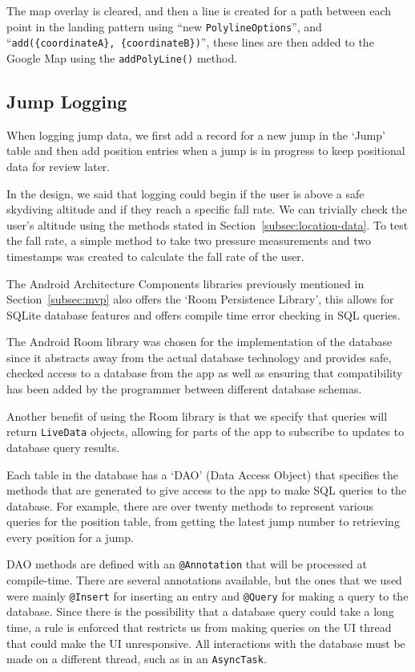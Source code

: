 The map overlay is cleared, and then a line is created for a path between each point in the landing pattern using ``new \texttt{PolylineOptions}'', and ``\verb|add({coordinateA}, {coordinateB})|'', these lines are then added to the Google Map using the \texttt{addPolyLine()} method.

\subsection{Jump Logging}
When logging jump data, we first add a record for a new jump in the `Jump' table and then add position entries when a jump is in progress to keep positional data for review later.

In the design, we said that logging could begin if the user is above a safe skydiving altitude and if they reach a specific fall rate. We can trivially check the user's altitude using the methods stated in Section~\ref{subsec:location-data}. To test the fall rate, a simple method to take two pressure measurements and two timestamps was created to calculate the fall rate of the user.

The Android Architecture Components libraries previously mentioned in Section~\ref{subsec:mvp} also offers the `Room Persistence Library', this allows for SQLite database features and offers compile time error checking in SQL queries.

The Android Room library was chosen for the implementation of the database since it abstracts away from the actual database technology and provides safe, checked access to a database from the app as well as ensuring that compatibility has been added by the programmer between different database schemas.

Another benefit of using the Room library is that we specify that queries will return \texttt{LiveData} objects, allowing for parts of the app to subscribe to updates to database query results.

Each table in the database has a `DAO' (Data Access Object) that specifies the methods that are generated to give access to the app to make SQL queries to the database. For example, there are over twenty methods to represent various queries for the position table, from getting the latest jump number to retrieving every position for a jump.

DAO methods are defined with an \texttt{@Annotation} that will be processed at compile-time. There are several annotations available, but the ones that we used were mainly \texttt{@Insert} for inserting an entry and \texttt{@Query} for making a query to the database. Since there is the possibility that a database query could take a long time, a rule is enforced that restricts us from making queries on the UI thread that could make the UI unresponsive. All interactions with the database must be made on a different thread, such as in an \texttt{AsyncTask}.

